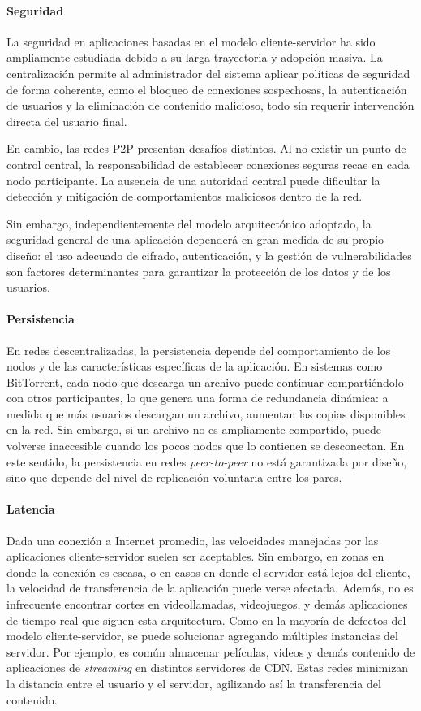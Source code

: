 \paragraph{Seguridad}
La seguridad en aplicaciones basadas en el modelo cliente-servidor ha sido ampliamente estudiada debido a su larga trayectoria y adopción masiva. La centralización permite al administrador del sistema aplicar políticas de seguridad de forma coherente, como el bloqueo de conexiones sospechosas, la autenticación de usuarios y la eliminación de contenido malicioso, todo sin requerir intervención directa del usuario final.

En cambio, las redes P2P presentan desafíos distintos. Al no existir un punto de control central, la responsabilidad de establecer conexiones seguras recae en cada nodo participante. La ausencia de una autoridad central puede dificultar la detección y mitigación de comportamientos maliciosos dentro de la red.

Sin embargo, independientemente del modelo arquitectónico adoptado, la seguridad general de una aplicación dependerá en gran medida de su propio diseño: el uso adecuado de cifrado, autenticación, y la gestión de vulnerabilidades son factores determinantes para garantizar la protección de los datos y de los usuarios.

\paragraph{Persistencia}
En redes descentralizadas, la persistencia depende del comportamiento de los nodos y de las características específicas de la aplicación. En sistemas como BitTorrent, cada nodo que descarga un archivo puede continuar compartiéndolo con otros participantes, lo que genera una forma de redundancia dinámica: a medida que más usuarios descargan un archivo, aumentan las copias disponibles en la red. Sin embargo, si un archivo no es ampliamente compartido, puede volverse inaccesible cuando los pocos nodos que lo contienen se desconectan. En este sentido, la persistencia en redes \textit{peer-to-peer} no está garantizada por diseño, sino que depende del nivel de replicación voluntaria entre los pares.

\paragraph{Latencia}
Dada una conexión a Internet promedio, las velocidades manejadas por las aplicaciones cliente-servidor suelen ser aceptables. Sin embargo, en zonas en donde la conexión es escasa, o en casos en donde el servidor está lejos del cliente, la velocidad de transferencia de la aplicación puede verse afectada. Además, no es infrecuente encontrar cortes en videollamadas, videojuegos, y demás aplicaciones de tiempo real que siguen esta arquitectura. Como en la mayoría de defectos del modelo cliente-servidor, se puede solucionar agregando múltiples instancias del servidor. Por ejemplo, es común almacenar  películas, videos y demás contenido de aplicaciones de \textit{streaming} en distintos servidores de CDN. Estas redes minimizan la distancia entre el usuario y el servidor, agilizando así la transferencia del contenido.


